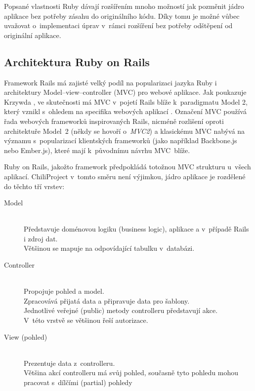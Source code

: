 \documentclass[thesis=B,czech]{FITthesis}[2012/05/02]
\begin{document}
Popsané vlastnosti Ruby dávají rozšířením mnoho možností jak pozměnit jádro
aplikace bez potřeby zásahu do originálního kódu. Díky tomu je možné
vůbec uvažovat o~implementaci úprav v~rámci rozšíření bez potřeby
odštěpení od originální aplikace.

\subsection{Architektura Ruby on Rails}

Framework Rails má zajisté velký podíl na popularizaci jazyka Ruby i
architektury Model--view--controller (MVC) pro webové aplikace. Jak
poukazuje Krzywda \citep{Krzywda2011}, ve skutečnosti má MVC v~pojetí Rails
blíže k~paradigmatu Model 2, který vznikl s~ohledem na specifika
webových aplikací \citep{McCallister2004}. Označení MVC používá řada
webových frameworků inspirovaných Rails, nicméně
rozlišení oproti architektuře Model~2 (někdy se hovoří o~\emph{MVC2}) a
klasickému MVC nabývá na významu s~popularizací klientských frameworků
(jako například Backbone.js nebo Ember.js), které mají k~původnímu
návrhu MVC~blíže.

Ruby on Rails, jakožto  framework \citep[kpt. 4, Make
Opinionated Software]{Fried2009}
předpokládá totožnou MVC strukturu u~všech aplikací. ChiliProject
v~tomto směru není výjimkou, jádro aplikace je rozdělené do těchto tří vrstev:

\begin{description}
\item[Model] \hfill \\
Představuje doménovou logiku (business logic), aplikace a v~případě Rails i zdroj dat. \hfill \\
Většinou se mapuje na odpovídající tabulku v~databázi.
\item[Controller] \hfill \\
Propojuje pohled a model. \hfill \\
Zpracovává přijatá data a připravuje data pro šablony. \hfill \\
Jednotlivé veřejné (public) metody controlleru představují akce. \hfill \\
V~této vrstvě se většinou řeší autorizace.
\item[View (pohled)] \hfill \\
Prezentuje data z~controlleru. \hfill \\
Většina akcí controlleru má svůj pohled, současně tyto pohledu mohou pracovat s~dílčími (partial) pohledy
\end{description}
\end{document}
